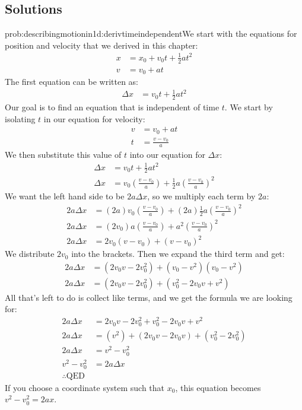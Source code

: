 \subsection{Solutions}
\begin{solution}{prob:describingmotionin1d:derivtimeindependent}\label{soln:describingmotionin1d:derivtimeindependent}We start with the equations for position and velocity that we derived in this chapter:
\begin{align*}
x&=x_0+v_0t+\frac{1}{2}at^2\\
v&=v_0+at
\end{align*}
The first equation can be written as:
\begin{align*}
\Delta x&=v_0t+\frac{1}{2}at^2
\end{align*}
Our goal is to find an equation that is independent of time $t$. We start by isolating $t$ in our equation for velocity:
\begin{align*}
v&=v_0+at\\
t&=\frac{v-v_0}{a}
\end{align*}
We then substitute this value of $t$ into our equation for $\Delta x$:
\begin{align*}
\Delta x&=v_0t+\frac{1}{2}at^2\\
\Delta x&=v_0\left(\frac{v-v_0}{a}\right)+\frac{1}{2}a\left(\frac{v-v_0}{a}\right)^2
\end{align*}
We want the left hand side to be $2a\Delta x$, so we multiply each term by $2a$:
\begin{align*}
2a\Delta x&=(2a)v_0\left( \frac{v-v_0}{a}\right) +(2a)\frac{1}{2}a\left( \frac{v-v_0}{a}\right) ^2\\
2a\Delta x&=(2v_0)a\left(\frac{v-v_0}{a}\right)+a^2\left( \frac{v-v_0}{a}\right) ^2\\
2a\Delta x&=2v_0(v-v_0)+(v-v_0)^2
\end{align*}
We distribute $2v_0$ into the brackets. Then we expand the third term and get:
\begin{align*}
2a\Delta x&=(2v_0v-2v_0^2)+(v_0-v^2)(v_0-v^2)\\
2a\Delta x&=(2v_0v-2v_0^2)+(v_0^2-2v_0v+v^2)
\end{align*}
All that's left to do is collect like terms, and we get the formula we are looking for:
\begin{align*}
2a\Delta x&=2v_0v-2v_0^2+v_0^2-2v_0v+v^2\\
2a\Delta x&=(v^2)+(2v_0v-2v_0v)+(v_0^2-2v_0^2)\\
2a\Delta x&=v^2-v_0^2\\
v^2-v_0^2&=2a\Delta x\\
\therefore \text{QED}
\end{align*}
If you choose a coordinate system such that $x_0$, this equation becomes $v^2-v_0^2=2ax$.
\end{solution}

